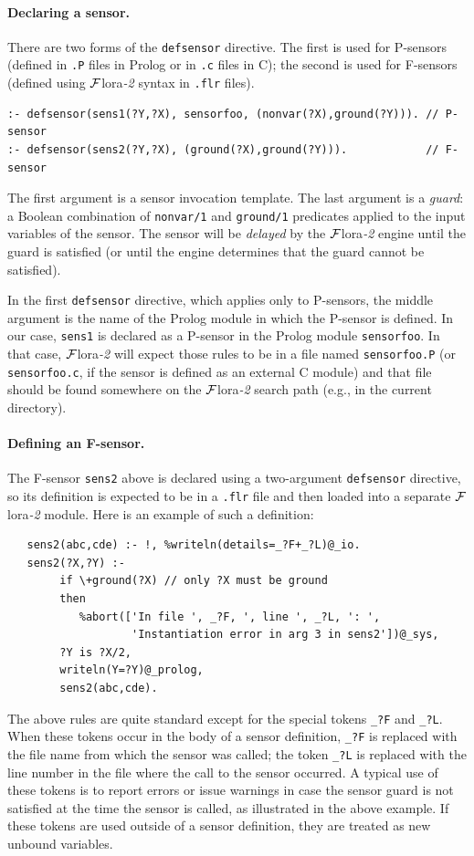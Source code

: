 \documentclass[11pt]{article}
\newcommand{\FLORA}{{\mbox{\sc ${\cal F}${lora}\rm\emph{-2}}}\xspace}
\begin{document}
\paragraph{Declaring a sensor.}
There are two forms of the \texttt{defsensor} directive. The first is used for
P-sensors (defined in \texttt{.P} files in Prolog or in \texttt{.c} files
in C); the second is used for
F-sensors (defined using \FLORA syntax in \texttt{.flr} files).
\begin{verbatim}
:- defsensor(sens1(?Y,?X), sensorfoo, (nonvar(?X),ground(?Y))). // P-sensor
:- defsensor(sens2(?Y,?X), (ground(?X),ground(?Y))).            // F-sensor
\end{verbatim}
The first argument is a sensor invocation template.  The last argument
is a \emph{guard}: a Boolean combination of \texttt{nonvar/1} and
\texttt{ground/1} predicates applied to the input variables of the
sensor. The sensor will be \emph{delayed} by the \FLORA engine until the
guard is satisfied (or until the engine determines that the guard cannot be
satisfied).

In the first \texttt{defsensor} directive, which applies only to P-sensors,
the middle argument is the name
of the Prolog module in which the P-sensor is defined. 
In our case, \texttt{sens1} is declared as a P-sensor
in the Prolog module \texttt{sensorfoo}. In that case, \FLORA
will expect those rules to be in a file named \texttt{sensorfoo.P}
(or \texttt{sensorfoo.c}, if the sensor is defined as an external C module)
and that file should be found somewhere on the \FLORA search path (e.g., in
the current directory).

\paragraph{Defining an F-sensor.}
The F-sensor \texttt{sens2} above is declared using a
two-argument \texttt{defsensor}  directive, so its definition is expected to be in a
\texttt{.flr} file and then loaded into a separate \FLORA module.
Here is an example of such a definition:
\begin{verbatim}
   sens2(abc,cde) :- !, %writeln(details=_?F+_?L)@_io.
   sens2(?X,?Y) :-
        if \+ground(?X) // only ?X must be ground
        then
           %abort(['In file ', _?F, ', line ', _?L, ': ',
                   'Instantiation error in arg 3 in sens2'])@_sys,
        ?Y is ?X/2,
        writeln(Y=?Y)@_prolog,
        sens2(abc,cde).
\end{verbatim}
The above rules are quite standard except for the special tokens
\texttt{\_?F} and \texttt{\_?L}. When these tokens occur in the body of a
sensor definition, \texttt{\_?F} is replaced with the file name from which
the sensor was called; the token \texttt{\_?L} is replaced with the line
number in the file where the call to the sensor occurred.
A typical use of these tokens is to report errors or issue warnings in case
the sensor guard is not satisfied at the time the sensor is called, as
illustrated in the above example.
If these tokens are used outside of a sensor definition, they are treated
as new unbound variables.
\end{document}
